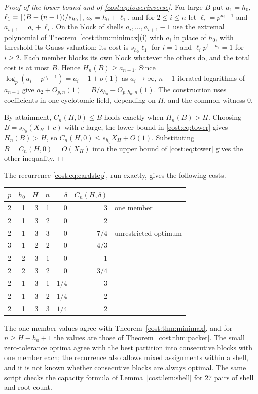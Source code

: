 \begin{proof}[Proof of the lower bound and of \eqref{cost:eq:towerinverse}]
For large $B$ put $a_1=h_0$, $\ell_1=\lfloor(B-(n-1))/s_{h_0}\rfloor$, $a_2=h_0+\ell_1$, and for
$2\le i\le n$ let $\ell_i=p^{a_i-1}$ and $a_{i+1}=a_i+\ell_i$. On the block of shells
$a_i,\dots,a_{i+1}-1$ use the extremal polynomial of Theorem~\ref{cost:thm:minimax}(i)
with $a_i$ in place of $h_0$, with threshold its Gauss valuation; its cost is $s_{h_0}\ell_1$
for $i=1$ and $\ell_ip^{1-a_i}=1$ for $i\ge2$. Each member blocks its own block whatever the
others do, and the total cost is at most $B$. Hence $H_n(B)\ge a_{n+1}$. Since
$\log_p(a_i+p^{a_i-1})=a_i-1+o(1)$ as $a_i\to\infty$, $n-1$ iterated logarithms of
$a_{n+1}$ give $a_2+O_{p,n}(1)=B/s_{h_0}+O_{p,h_0,n}(1)$. The construction uses
coefficients in one cyclotomic field, depending on $H$, and the common witness $0$.

By attainment, $C_n(H,0)\le B$ holds exactly when $H_n(B)>H$. Choosing
$B=s_{h_0}(X_H+c)$ with $c$ large, the lower bound in \eqref{cost:eq:tower} gives
$H_n(B)>H$, so $C_n(H,0)\le s_{h_0}X_H+O(1)$. Substituting $B=C_n(H,0)=O(X_H)$ into the
upper bound of \eqref{cost:eq:tower} gives the other inequality.
\end{proof}

\begin{example}\label{cost:ex:cardinality}
The recurrence \eqref{cost:eq:cardstep}, run exactly, gives the following costs.
\begin{center}
\begin{tabular}{rrrrrrl}
\toprule
$p$ & $h_0$ & $H$ & $n$ & $\delta$ & $C_n(H,\delta)$ & \\
\midrule
2&1&3&1&0&3&one member\\
2&1&3&2&0&2&\\
2&1&3&3&0&$7/4$&unrestricted optimum\\
3&1&2&2&0&$4/3$&\\
2&2&3&1&0&1&\\
2&2&3&2&0&$3/4$&\\
2&1&3&1&$1/4$&3&\\
2&1&3&2&$1/4$&2&\\
2&1&3&3&$1/4$&2&\\
\bottomrule
\end{tabular}
\end{center}
The one-member values agree with Theorem~\ref{cost:thm:minimax}, and for $n\ge H-h_0+1$ the
values are those of Theorem~\ref{cost:thm:packet}. The small zero-tolerance optima agree
with the best partition into consecutive blocks with one member each; the recurrence
also allows mixed assignments within a shell, and it is not known whether consecutive
blocks are always optimal. The same script checks the capacity formula of
Lemma~\ref{cost:lem:shell} for $27$ pairs of shell and root count.
\end{example}

